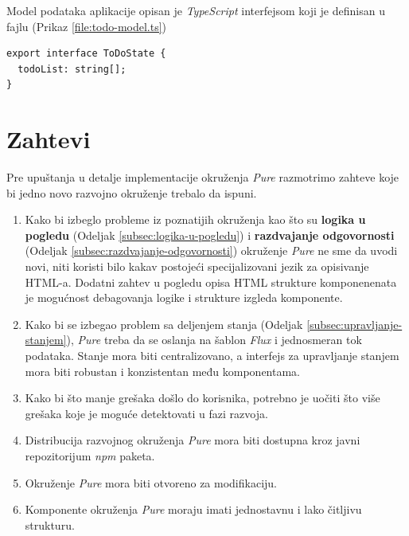 \documentclass[12pt,oneside]{memoir}
\newcommand{\code}[1]{\colorbox{codegray}{\texttt{\scalebox{0.9}{#1}}}}%
\begin{document}
Model podataka aplikacije opisan je \emph{TypeScript} interfejsom koji je definisan u fajlu \code{src/model.ts} (Prikaz \ref{file:todo-model.ts})
\begin{lstlisting}[style=jsStyle, caption={Fajl \code{src/model.ts}},label=file:todo-model.ts]
export interface ToDoState {
  todoList: string[];
}
\end{lstlisting}
\chapter{Zahtevi}
Pre upuštanja u detalje implementacije okruženja \emph{Pure}
razmotrimo zahteve koje bi jedno novo razvojno okruženje trebalo da ispuni.
\begin{enumerate}
  \item Kako bi izbeglo probleme iz poznatijih okruženja kao što su
  \textbf{logika u pogledu} (Odeljak \ref{subsec:logika-u-pogledu}) i
  \textbf{razdvajanje odgovornosti} (Odeljak \ref{subsec:razdvajanje-odgovornosti})
  okruženje \emph{Pure} ne sme da uvodi novi, niti koristi bilo kakav postojeći
  specijalizovani jezik za opisivanje HTML-a. Dodatni zahtev u pogledu
  opisa HTML strukture komponenenata je mogućnost debagovanja
  logike i strukture izgleda komponente.
  \item 
  Kako bi se izbegao problem sa deljenjem stanja (Odeljak \ref{subsec:upravljanje-stanjem}), \emph{Pure} treba da
  se oslanja na šablon \emph{Flux} i jednosmeran tok podataka.
  Stanje mora biti centralizovano, a interfejs za upravljanje stanjem
  mora biti robustan i konzistentan među komponentama.
 \item Kako bi što manje grešaka došlo do korisnika, potrebno je uočiti
 što više grešaka koje je moguće detektovati u fazi razvoja.
 \item Distribucija razvojnog okruženja \emph{Pure} mora biti dostupna kroz
 javni repozitorijum \emph{npm} paketa.
 \item Okruženje \emph{Pure} mora biti otvoreno za modifikaciju.
 \item Komponente okruženja \emph{Pure} moraju imati jednostavnu i lako čitljivu strukturu. 
\end{enumerate}
\end{document}
